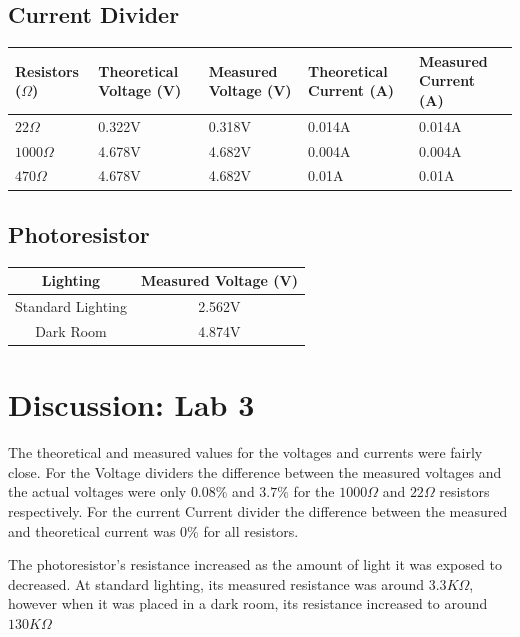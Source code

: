 \documentclass[12pt]{article}
\begin{document}
\subsection*{Current Divider}
\begin{center}
\begin{tabular}{||m{1.5cm}|m{2cm}|m{2cm}|m{2cm}|m{2cm}||}
\hline
Resistors ($\Omega$) & Theoretical Voltage (V) & Measured Voltage (V) & Theoretical Current (A) & Measured Current (A)\\
\hline
\hline
$22\Omega$ & 0.322V & 0.318V&0.014A &0.014A\\
\hline
$1000\Omega$ &4.678V &4.682V &0.004A &0.004A\\
\hline
$470\Omega$ &4.678V &4.682V &0.01A &0.01A\\
\hline
\end{tabular}
\end{center}
\subsection*{Photoresistor}
\begin{center}
\begin{tabular}{||c|c ||}
\hline
Lighting & Measured Voltage (V)\\
\hline
\hline
Standard Lighting & 2.562V\\
\hline
Dark Room  &4.874V\\
\hline
\end{tabular}
\end{center}
\section*{Discussion: Lab 3}
The theoretical and measured values for the voltages and currents were fairly close. For the Voltage dividers the difference between the measured voltages and the actual voltages were only $0.08\%$ and $3.7\%$ for the $1000\Omega$ and $22\Omega$ resistors respectively. For the current  Current divider the difference between the measured and theoretical current was $0\%$ for all resistors.

The photoresistor's resistance increased as the amount of light it was exposed to decreased. At standard lighting, its measured resistance was around $3.3K\Omega$, however when it was placed in a dark room, its resistance increased to around $130K\Omega$
\end{document}
